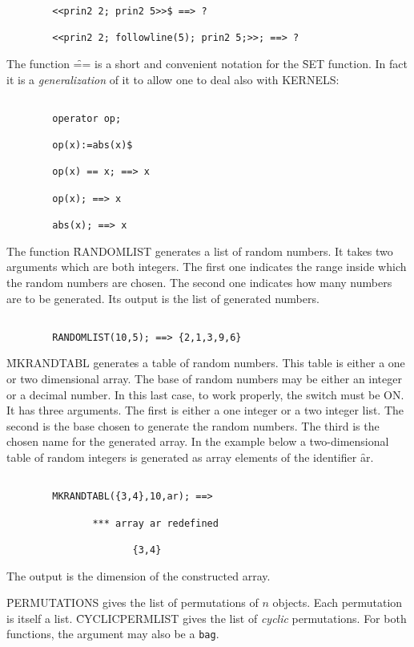 \begin{itemize}
\begin{verbatim}
        <<prin2 2; prin2 5>>$ ==> ?

        <<prin2 2; followline(5); prin2 5;>>; ==> ?

\end{verbatim}
The function \f{==} is a short and convenient notation for the \f{SET}
function. In fact it is a {\em generalization} of it to allow one to
deal also with KERNELS:
\begin{verbatim}

        operator op;

        op(x):=abs(x)$

        op(x) == x; ==> x

        op(x); ==> x
        
        abs(x); ==> x

\end{verbatim}
The function \f{RANDOMLIST} generates a list of random numbers. It takes
two arguments which are both integers. The first one indicates the range
inside which the random numbers are chosen. The second one indicates how
many numbers are to be generated. Its output is the list of 
generated numbers.
\begin{verbatim}

        RANDOMLIST(10,5); ==> {2,1,3,9,6}

\end{verbatim}
\f{MKRANDTABL} generates a table of random numbers. This table is either
a one or two dimensional array. The base of random numbers may be either
an integer or a decimal number. In this last case, to work properly,
the switch  must be ON. It has three arguments. The first is
either a one integer or a two integer list. The second is the base chosen
to generate the random numbers. The third is the chosen name for the
generated array. In the example below a two-dimensional table of
random integers is generated as array elements of the identifier {\f ar}.
\begin{verbatim}

        MKRANDTABL({3,4},10,ar); ==>

               *** array ar redefined

                      {3,4}

\end{verbatim}
The output is the dimension of the constructed array.

\f{PERMUTATIONS} gives the list of permutations of $n$ objects.
Each permutation is itself a list. \f{CYCLICPERMLIST} gives the list of
{\em cyclic} permutations. For both functions, the argument may
also be a {\tt bag}.
\begin{verbatim}


\end{verbatim}
\end{itemize}
